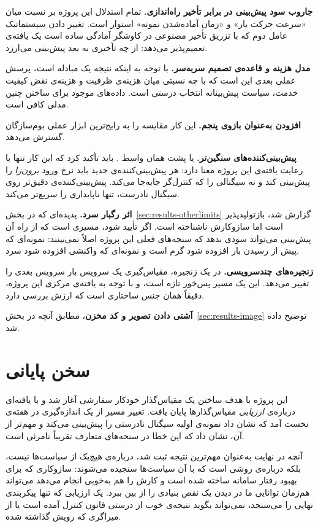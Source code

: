 \textbf{جاروب سود پیش‌بینی در برابر تأخیر راه‌اندازی.} تمام استدلال این پروژه بر نسبت میان
«سرعت حرکت بار» و «زمان آماده‌شدن نمونه» استوار است. تغییر دادن سیستماتیک عامل دوم \mdash{} که با
تزریق تأخیر مصنوعی در کاوشگر آمادگی ساده است \mdash{} یک یافته‌ی تعمیم‌پذیر می‌دهد: از چه تأخیری به
بعد پیش‌بینی می‌ارزد.

\textbf{مدل هزینه و قاعده‌ی تصمیم سربه‌سر.} با توجه به اینکه نتیجه یک مبادله است، پرسش عملی
بعدی این است که با چه نسبتی میان هزینه‌ی ظرفیت و هزینه‌ی نقض کیفیت خدمت، سیاست پیش‌بینانه
انتخاب درستی است. داده‌های موجود برای ساختن چنین مدلی کافی است.

\textbf{افزودن  به‌عنوان بازوی پنجم.} این کار مقایسه را به رایج‌ترین ابزار عملی
بوم‌سازگان گسترش می‌دهد.

\textbf{پیش‌بینی‌کننده‌های سنگین‌تر.}  یا  پشت همان واسط
. باید تأکید کرد که این کار تنها با رعایت یافته‌ی این پروژه معنا دارد: هر
پیش‌بینی‌کننده‌ی جدید باید نرخ ورود \emph{برون‌زا} را پیش‌بینی کند و نه سیگنالی را که
کنترل‌گر جابه‌جا می‌کند. پیش‌بینی‌کننده‌ی دقیق‌تر روی سیگنال نادرست، تنها ناپایداری را
سریع‌تر می‌کند.

\textbf{اثر رگبار سرد.} پدیده‌ای که در بخش~\ref{sec:results-otherlimits} گزارش شد،
بازتولیدپذیر است اما سازوکارش ناشناخته است. اگر تأیید شود، مسیری است که از راه آن پیش‌بینی
می‌تواند سودی بدهد که سنجه‌های فعلی این پروژه اصلاً نمی‌بینند: نمونه‌ای که پیش از رسیدن بار
افزوده شود گرم است و نمونه‌ای که واکنشی افزوده شود سرد.

\textbf{زنجیره‌های چندسرویسی.} در یک زنجیره، مقیاس‌گیری یک سرویس بار سرویس بعدی را تغییر
می‌دهد. این یک مسیر پس‌خور تازه است، و با توجه به یافته‌ی مرکزی این پروژه، دقیقاً همان جنس
ساختاری است که ارزش بررسی دارد.

\textbf{آشتی دادن تصویر و کد مخزن}، مطابق آنچه در بخش~\ref{sec:results-image} توضیح داده شد.

\section{سخن پایانی}
\label{sec:conclusion-final}

این پروژه با هدف ساختن یک مقیاس‌گذار خودکار سفارشی آغاز شد و با یافته‌ای درباره‌ی
\emph{ارزیابی} مقیاس‌گذارها پایان یافت. تغییر مسیر از یک اندازه‌گیری در هفته‌ی نخست آمد که
نشان داد نمونه‌ی اولیه سیگنال نادرستی را پیش‌بینی می‌کند \mdash{} و مهم‌تر از آن، نشان داد که این
خطا در سنجه‌های متعارف تقریباً نامرئی است.

آنچه در نهایت به‌عنوان مهم‌ترین نتیجه ثبت شد، درباره‌ی هیچ‌یک از سیاست‌ها نیست، بلکه درباره‌ی
روشی است که با آن سیاست‌ها سنجیده می‌شوند: سازوکاری که برای بهبود رفتار سامانه ساخته شده
است \mdash{} و کارش را هم به‌خوبی انجام می‌دهد \mdash{} می‌تواند هم‌زمان توانایی ما در دیدن یک نقص بنیادی را
از بین ببرد. یک ارزیابی که تنها پیکربندی نهایی را می‌سنجد، نمی‌تواند بگوید نتیجه‌ی خوب از
درستی قانون کنترل آمده است یا از میراگری که رویش گذاشته شده.
